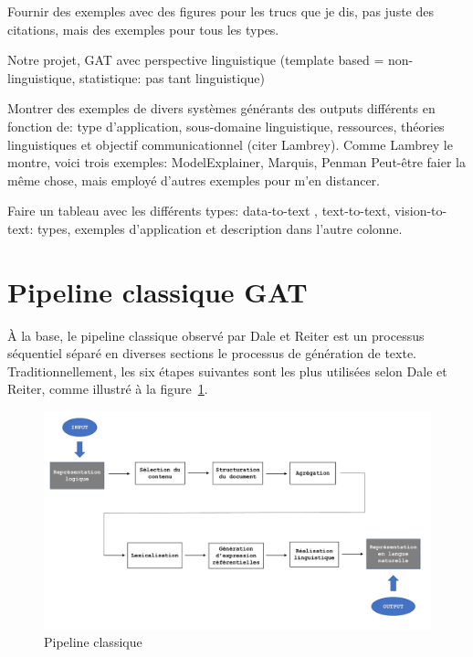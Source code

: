 Fournir des exemples avec des figures pour les trucs que je dis, pas juste des citations, mais des exemples pour tous les types.

Notre projet, GAT avec perspective linguistique (template based = non-linguistique, statistique: pas tant linguistique)

Montrer des exemples de divers systèmes générants des outputs différents en fonction de: type d'application, sous-domaine linguistique, ressources, théories linguistiques et objectif communicationnel (citer Lambrey). Comme Lambrey le montre, voici trois exemples: ModelExplainer, Marquis, Penman
Peut-être faier la même chose, mais employé d'autres exemples pour m'en distancer.

Faire un tableau avec les différents types: data-to-text , text-to-text, vision-to-text: types, exemples d'application et description dans l'autre colonne.

\section{Pipeline classique GAT}

À la base, le pipeline classique observé par Dale et Reiter est un processus séquentiel séparé en diverses sections le processus de génération de texte\citep{ReiterBuildingNaturalLanguage2000}. Traditionnellement, les six étapes suivantes sont les plus utilisées selon Dale et Reiter, comme illustré à la figure~\ref{fig:Pipeline}.


\begin{figure}[htb] %
	\centering
	\includegraphics[width=1\textwidth, trim = {0cm 0cm 0cm 0cm},clip]{ch2/figs/pipeline.pdf}
	\caption{Pipeline classique}
	\label{fig:Pipeline}
\end{figure}

